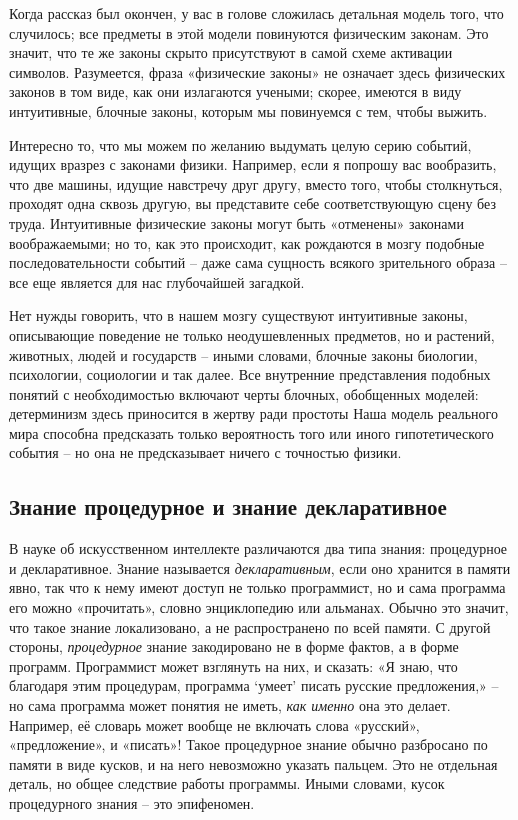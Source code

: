 \documentclass[../main.tex]{subfiles}
\begin{document}
Когда рассказ был окончен, у вас в голове сложилась детальная модель того, что случилось; все предметы в этой модели повинуются физическим законам. Это значит, что те же законы скрыто присутствуют в самой схеме активации символов. Разумеется, фраза «физические законы» не означает здесь физических законов в том виде, как они излагаются учеными; скорее, имеются в виду интуитивные, блочные законы, которым мы повинуемся с тем, чтобы выжить.

Интересно то, что мы можем по желанию выдумать целую серию событий, идущих вразрез с законами физики. Например, если я попрошу вас вообразить, что две машины, идущие навстречу друг другу, вместо того, чтобы столкнуться, проходят одна сквозь другую, вы представите себе соответствующую сцену без труда. Интуитивные физические законы могут быть «отменены» законами воображаемыми; но то, как это происходит, как рождаются в мозгу подобные последовательности событий \--- даже сама сущность всякого зрительного образа \--- все еще является для нас глубочайшей загадкой.

Нет нужды говорить, что в нашем мозгу существуют интуитивные законы, описывающие поведение не только неодушевленных предметов, но и растений, животных, людей и государств \--- иными словами, блочные законы биологии, психологии, социологии и так далее. Все внутренние представления подобных понятий с необходимостью включают черты блочных, обобщенных моделей: детерминизм здесь приносится в жертву ради простоты Наша модель реального мира способна предсказать только вероятность того или иного гипотетического события \--- но она не предсказывает ничего с точностью физики.


\subsection{Знание процедурное и знание декларативное}

В науке об искусственном интеллекте различаются два типа знания: процедурное и декларативное. Знание называется \emph{декларативным}, если оно хранится в памяти явно, так что к нему имеют доступ не только программист, но и сама программа его можно «прочитать», словно энциклопедию или альманах. Обычно это значит, что такое знание локализовано, а не распространено по всей памяти. С другой стороны, \emph{процедурное} знание закодировано не в форме фактов, а в форме программ. Программист может взглянуть на них, и сказать: «Я знаю, что благодаря этим процедурам, программа \enquote*{умеет} писать русские предложения,» \--- но сама программа может понятия не иметь, \emph{как именно} она это делает. Например, её словарь может вообще не включать слова «русский», «предложение», и «писать»! Такое процедурное знание обычно разбросано по памяти в виде кусков, и на него невозможно указать пальцем. Это не отдельная деталь, но общее следствие работы программы. Иными словами, кусок процедурного знания \--- это эпифеномен.
\end{document}
